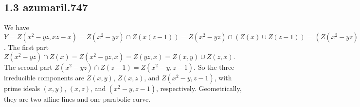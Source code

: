 \subsection*{1.3   {azumaril.747}}

We have $Y=Z(x^2-yz,xz-x)=Z(x^2-yz)\cap Z(x(z-1))=Z(x^2-yz)\cap(Z(x)\cup Z(z-1))=(Z(x^2-yz)\cap Z(x))\cup (Z(x^2-yz)\cap Z(z-1))$. The first part $Z(x^2-yz)\cap Z(x)=Z(x^2-yz,x)=Z(yz,x)=Z(x,y)\cup Z(z,x)$. The second part $Z(x^2-yz)\cap Z(z-1)=Z(x^2-y,z-1)$. So the three irreducible components are $Z(x,y)$, $Z(x,z)$, and  $Z(x^2-y,z-1)$, with prime ideals $(x,y)$, $(x,z)$, and $(x^2-y,z-1)$, respectively. Geometrically, they are two affine lines and one parabolic curve. 
